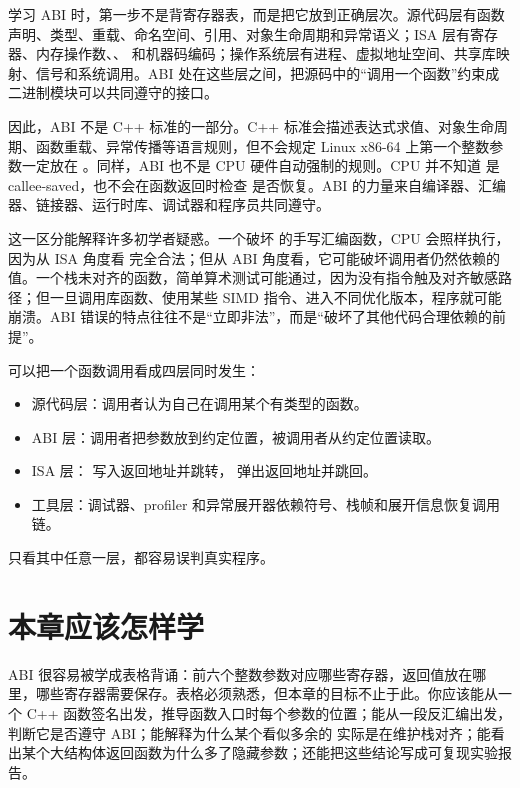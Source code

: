 学习 ABI 时，第一步不是背寄存器表，而是把它放到正确层次。源代码层有函数声明、类型、重载、命名空间、引用、对象生命周期和异常语义；ISA 层有寄存器、内存操作数、、 和机器码编码；操作系统层有进程、虚拟地址空间、共享库映射、信号和系统调用。ABI 处在这些层之间，把源码中的“调用一个函数”约束成二进制模块可以共同遵守的接口。

因此，ABI 不是 C++ 标准的一部分。C++ 标准会描述表达式求值、对象生命周期、函数重载、异常传播等语言规则，但不会规定 Linux x86-64 上第一个整数参数一定放在 。同样，ABI 也不是 CPU 硬件自动强制的规则。CPU 并不知道  是 callee-saved，也不会在函数返回时检查  是否恢复。ABI 的力量来自编译器、汇编器、链接器、运行时库、调试器和程序员共同遵守。

这一区分能解释许多初学者疑惑。一个破坏  的手写汇编函数，CPU 会照样执行，因为从 ISA 角度看  完全合法；但从 ABI 角度看，它可能破坏调用者仍然依赖的值。一个栈未对齐的函数，简单算术测试可能通过，因为没有指令触及对齐敏感路径；但一旦调用库函数、使用某些 SIMD 指令、进入不同优化版本，程序就可能崩溃。ABI 错误的特点往往不是“立即非法”，而是“破坏了其他代码合理依赖的前提”。

\begin{mentalmodel}
可以把一个函数调用看成四层同时发生：

\begin{itemize}
  \item 源代码层：调用者认为自己在调用某个有类型的函数。
  \item ABI 层：调用者把参数放到约定位置，被调用者从约定位置读取。
  \item ISA 层： 写入返回地址并跳转， 弹出返回地址并跳回。
  \item 工具层：调试器、profiler 和异常展开器依赖符号、栈帧和展开信息恢复调用链。
\end{itemize}

只看其中任意一层，都容易误判真实程序。
\end{mentalmodel}

\section{本章应该怎样学}

ABI 很容易被学成表格背诵：前六个整数参数对应哪些寄存器，返回值放在哪里，哪些寄存器需要保存。表格必须熟悉，但本章的目标不止于此。你应该能从一个 C++ 函数签名出发，推导函数入口时每个参数的位置；能从一段反汇编出发，判断它是否遵守 ABI；能解释为什么某个看似多余的  实际是在维护栈对齐；能看出某个大结构体返回函数为什么多了隐藏参数；还能把这些结论写成可复现实验报告。

